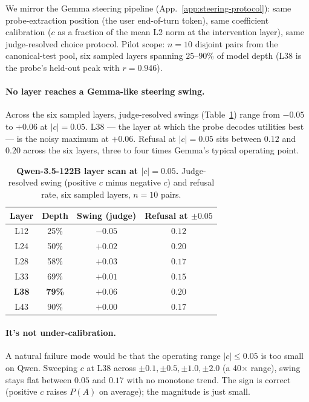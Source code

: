 \documentclass{article}
\begin{document}
We mirror the Gemma steering pipeline (App.~\ref{app:steering-protocol}): same probe-extraction position (the user end-of-turn token), same coefficient calibration ($c$ as a fraction of the mean L2 norm at the intervention layer), same judge-resolved choice protocol. Pilot scope: $n = 10$ disjoint pairs from the canonical-test pool, six sampled layers spanning $25$--$90\%$ of model depth (L38 is the probe's held-out peak with $r = 0.946$).

\paragraph{No layer reaches a Gemma-like steering swing.} Across the six sampled layers, judge-resolved swings (Table~\ref{tab:qwen-layer-scan}) range from $-0.05$ to $+0.06$ at $|c| = 0.05$. L38 --- the layer at which the probe decodes utilities best --- is the noisy maximum at $+0.06$. Refusal at $|c| = 0.05$ sits between $0.12$ and $0.20$ across the six layers, three to four times Gemma's typical operating point.

\begin{table}[!t]
  \centering
  \caption{\textbf{Qwen-3.5-122B layer scan at $|c| = 0.05$.} Judge-resolved swing (positive $c$ minus negative $c$) and refusal rate, six sampled layers, $n = 10$ pairs.}
  \label{tab:qwen-layer-scan}
  \begin{tabular}{cccc}
    \toprule
    Layer & Depth & Swing (judge) & Refusal at $\pm 0.05$ \\
    \midrule
    L12 & 25\% & $-0.05$ & $0.12$ \\
    L24 & 50\% & $+0.02$ & $0.20$ \\
    L28 & 58\% & $+0.03$ & $0.17$ \\
    L33 & 69\% & $+0.01$ & $0.15$ \\
    \textbf{L38} & \textbf{79\%} & $\mathbf{+0.06}$ & $\mathbf{0.20}$ \\
    L43 & 90\% & $+0.00$ & $0.17$ \\
    \bottomrule
  \end{tabular}
\end{table}

\paragraph{It's not under-calibration.} A natural failure mode would be that the operating range $|c| \le 0.05$ is too small on Qwen. Sweeping $c$ at L38 across $\pm 0.1, \pm 0.5, \pm 1.0, \pm 2.0$ (a 40$\times$ range), swing stays flat between $0.05$ and $0.17$ with no monotone trend. The sign is correct (positive $c$ raises $P(A)$ on average); the magnitude is just small.
\end{document}
